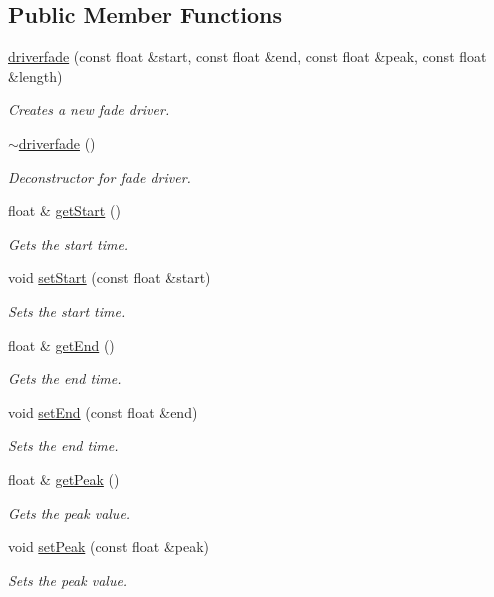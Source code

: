 \subsection*{Public Member Functions}
\begin{DoxyCompactItemize}
\item 
\hyperlink{classflounder_1_1driverfade_a4aa6c6ec1352f9af77c218f4483896e7}{driverfade} (const float \&start, const float \&end, const float \&peak, const float \&length)
\begin{DoxyCompactList}\small\item\em Creates a new fade driver. \end{DoxyCompactList}\item 
\hyperlink{classflounder_1_1driverfade_a230478bdd0efec38ea6dd3b598676fd3}{$\sim$driverfade} ()
\begin{DoxyCompactList}\small\item\em Deconstructor for fade driver. \end{DoxyCompactList}\item 
float \& \hyperlink{classflounder_1_1driverfade_a16f5ada8b7e3708f57ec4dee87b5bd59}{get\+Start} ()
\begin{DoxyCompactList}\small\item\em Gets the start time. \end{DoxyCompactList}\item 
void \hyperlink{classflounder_1_1driverfade_a6a38fe711e23d2ee17909491721b9c5d}{set\+Start} (const float \&start)
\begin{DoxyCompactList}\small\item\em Sets the start time. \end{DoxyCompactList}\item 
float \& \hyperlink{classflounder_1_1driverfade_a8afc25faac85241befa44a3199d6aa66}{get\+End} ()
\begin{DoxyCompactList}\small\item\em Gets the end time. \end{DoxyCompactList}\item 
void \hyperlink{classflounder_1_1driverfade_aa4cec5e23d739ade9704cd09062c8e61}{set\+End} (const float \&end)
\begin{DoxyCompactList}\small\item\em Sets the end time. \end{DoxyCompactList}\item 
float \& \hyperlink{classflounder_1_1driverfade_adc6fe117b31bce8bbeb315f42238c5c7}{get\+Peak} ()
\begin{DoxyCompactList}\small\item\em Gets the peak value. \end{DoxyCompactList}\item 
void \hyperlink{classflounder_1_1driverfade_a2ef147225bc3371021ab34d24ff830c2}{set\+Peak} (const float \&peak)
\begin{DoxyCompactList}\small\item\em Sets the peak value. \end{DoxyCompactList}\end{DoxyCompactItemize}
